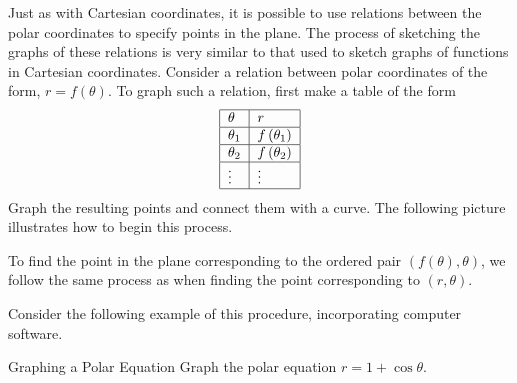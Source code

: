 Just as with Cartesian coordinates, it is possible to use
relations between the polar coordinates to specify points in the plane. The
process of sketching the graphs of these relations is very similar to that used to sketch
graphs of functions in Cartesian coordinates. Consider a relation between polar coordinates of the form, $r=f\left( \theta \right)$. To graph such a relation, first make a table of
the form 
\begin{equation*}
\begin{tabular}{|l|l|}
\hline
$\theta $ & $r$ \\ \hline
$\theta _{1}$ & $f\left( \theta _{1}\right) $ \\ \hline
$\theta _{2}$ & $f\left( \theta _{2}\right) $ \\ \hline
$\vdots $ & $\vdots $ \\ \hline
\end{tabular}
\end{equation*}
Graph the resulting points and connect them with a curve. The
following picture illustrates how to begin this process.

\begin{center}
\end{center}

To find the point in the plane corresponding to the ordered pair $\left( f\left(
\theta \right) ,\theta \right) $, we follow the same process as when finding the point corresponding to $\left( r, \theta \right)$.

Consider the following example of this procedure, incorporating computer software.

\begin{example}{Graphing a Polar Equation}{}
Graph the polar equation $r=1+\cos \theta$.
\end{example}


